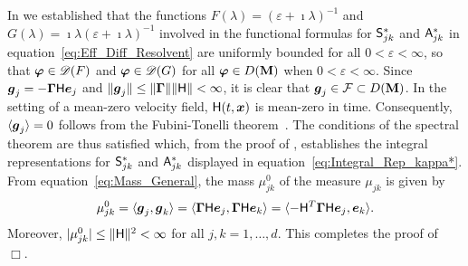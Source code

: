 \documentclass[amsa]{ipart}
\begin{document}
In  we established that the functions
$F(\lambda)=(\varepsilon+\imath\lambda)^{-1}$ and $G(\lambda)=\imath\lambda(\varepsilon+\imath\lambda)^{-1}$ involved in the functional
formulas for $\mathsf{S}^*_{jk}$ and $\mathsf{A}^*_{jk}$ in
equation~\eqref{eq:Eff_Diff_Resolvent} are uniformly bounded for all
$0<\varepsilon<\infty$, so that $\boldsymbol{\varphi}\in\mathscr{D}(F)$ and $\boldsymbol{\varphi}\in\mathscr{D}(G)$ for all
$\boldsymbol{\varphi}\in D(\mathbf{M})$ when $0<\varepsilon<\infty$.  Since $\boldsymbol{g}_j=-\mbox{\boldmath${\Gamma}$}\mathsf{H}\boldsymbol{e}_j$
and $\|\boldsymbol{g}_j\|\leq\|\mbox{\boldmath${\Gamma}$}\|\|\mathsf{H}\|<\infty$, it is clear that $\boldsymbol{g}_j\in\mathcal{F}\subset
D(\mathbf{M})$. In the setting of a mean-zero velocity field, $\mathsf{H}(t,\boldsymbol{x})$
is mean-zero in time. Consequently, $\langle\boldsymbol{g}_j\rangle=0$ follows from the
Fubini-Tonelli theorem~\cite{Folland:99:RealAnalysis}. The conditions
of the spectral theorem are thus satisfied which, from the proof of
, establishes the integral representations
for $\mathsf{S}^*_{jk}$ and $\mathsf{A}^*_{jk}$ displayed in
equation~\eqref{eq:Integral_Rep_kappa*}. From
equation~\eqref{eq:Mass_General}, the mass $\mu_{jk}^0$ of the measure
$\mu_{jk}$ is given by
% 
\begin{align}\label{eq:Mass}
  \mu^0_{jk}   =\langle\vecg_j,\vecg_k\rangle
        =\langle\bGamma\Hm\vece_j,\bGamma\Hm\vece_k\rangle 
        =\langle-\Hm^T\bGamma\Hm\vece_j,\vece_k\rangle.     
\end{align}
%
Moreover,  $|\mu^0_{jk}|\leq\|\mathsf{H}\|^2<\infty$ for all $j,k=1,\ldots,d$.  This completes the proof
of~ $\Box$.  
\end{document}
